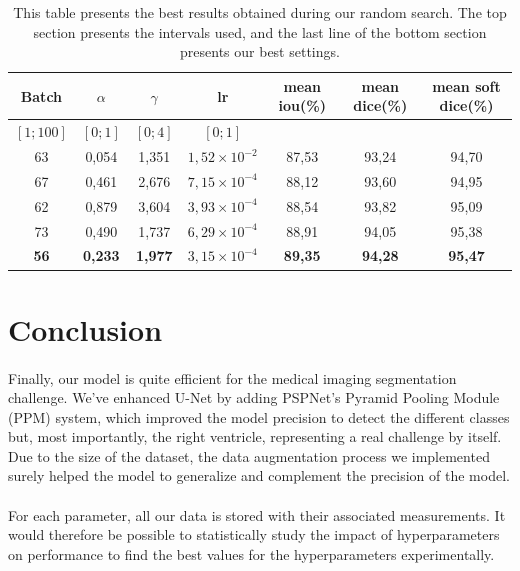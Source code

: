 \documentclass[english]{article}
\begin{document}
\begin{table}[H]
    \footnotesize
    \centering
    \begin{tabular}{c c c c c c c}
        \hline
        Batch & \(\alpha\) & \(\gamma\) & lr & mean iou(\%) & mean dice(\%) & mean soft dice(\%)\\
        \hline
        \hline
        \([1;100]\) & \([0;1]\) & \([0;4]\) & \([0;1]\) \\
        \hline
        63 & 0,054 & 1,351 & \(1,52\times 10^{-2}\) & 87,53 & 93,24 & 94,70\\
        67 & 0,461 & 2,676 & \(7,15\times 10^{-4}\) & 88,12 & 93,60 & 94,95\\
        62 & 0,879 & 3,604 & \(3,93\times 10^{-4}\) & 88,54 & 93,82 & 95,09\\
        73 & 0,490 & 1,737 & \(6,29\times 10^{-4}\) & 88,91 & 94,05 & 95,38\\
        \textbf{56} & \textbf{0,233} & \textbf{1,977} & \textbf{\(3,15\times 10^{-4}\)} & \textbf{89,35} & \textbf{94,28} & \textbf{95,47}\\
        \hline
    \end{tabular}
    \caption{This table presents the best results obtained during our random search. The top section presents the intervals used, and the last line of the bottom section presents our best settings.}
    \label{tab:comp_params}
\end{table}


\section{Conclusion}
\paragraph{}
Finally, our model is quite efficient for the medical imaging segmentation challenge. We've enhanced U-Net by adding PSPNet's Pyramid Pooling Module (PPM) system, which improved the model precision to detect the different classes but, most importantly, the right ventricle, representing a real challenge by itself. Due to the size of the dataset, the data augmentation process we implemented surely helped the model to generalize and complement the precision of the model.
\paragraph{}
For each parameter, all our data is stored with their associated measurements. It would therefore be possible to statistically study the impact of hyperparameters on performance to find the best values for the hyperparameters experimentally.


\newpage

\end{document}
